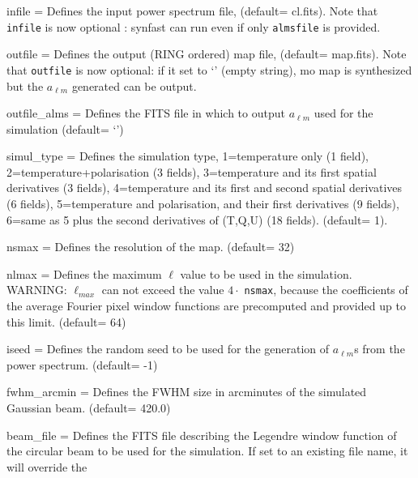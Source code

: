 \begin{qualifiers}
  \begin{qulistwide}{} %
    \item[{infile = }]%
 Defines the input power spectrum file,
	(default= cl.fits). Note that {\tt infile} is now optional :
    synfast can run even if only {\tt almsfile} is provided.
    \item[{outfile = }]%
 Defines the output (RING ordered) map file,
(default= map.fits). Note that {\tt outfile} is now optional: if it set to 
      `' (empty string),  mo map is synthesized but the $a_{\ell m}$ generated can be output.
    \item[{outfile\_alms = }]%
 Defines the FITS file in which to output $a_{\ell m}$ used
      for the simulation (default= `')
     \item[{simul\_type = }]%
 Defines the simulation type, 1=temperature only (1 field),
       2=temperature+polarisation (3 fields), 3=temperature and its first
spatial derivatives (3 fields),
       4=temperature and its first and second spatial derivatives (6 fields), 5=temperature
       and polarisation, and their first derivatives (9 fields), 6=same as 5
       plus the second derivatives of (T,Q,U) (18 fields).
(default= 1).
    \item[{nsmax = }]%
 Defines the resolution of the map.
(default= 32)
     \item[{nlmax = }]%
 Defines the maximum $\ell$ value 
to be used in the simulation. WARNING: $\ell_{max}$ can not exceed
the value $4\cdot$ {\tt nsmax}, because the coefficients of the  average Fourier 
pixel window functions
are precomputed and provided up to this limit.
(default= 64)
      \item[{iseed = }]%
 Defines the random seed to be used 
for the generation of $a_{\ell m}$s from the power spectrum.
(default= -1)
    \item[{fwhm\_arcmin = }]%
 Defines the FWHM size in arcminutes 
of the simulated Gaussian beam.
(default= 420.0)
%
    \item[{beam\_file = }]%
 Defines the FITS file describing the
    Legendre window
    function of the circular beam to be used for the
    simulation. If set to an existing file name, it will override the

\end{qulistwide}
\end{qualifiers}
